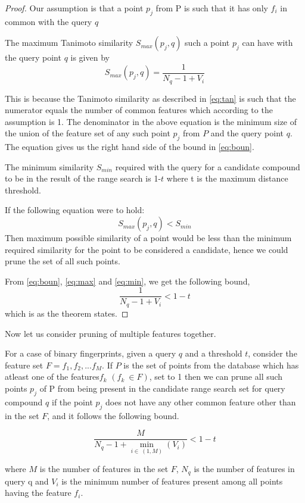 \begin{proof}
\label{proof1}
Our assumption is that a point $p_j$ from P is such that it has only $f_i$ in common with the query $q$  
 
The maximum Tanimoto similarity $S_{max}(p_j,q)$ such a point $p_j$ can have with the query point $q$ is given by
\begin{equation}
\label{eq:max}
S_{max}(p_j,q)=\frac{1}{N_q - 1 + V_{i}}
\end{equation}

This is because the Tanimoto similarity as described in \autoref{eq:tan} is such that the numerator equals the number of common features which according to the assumption is 1. The denominator in the above equation is the minimum size of the union of the feature set of any such point $p_j$ from $P$ and the query point $q$.
The equation gives us the right hand side of the bound 
in \autoref{eq:boun}. 

The minimum similarity $S_{min}$ required with the query for a candidate compound to be in the result of the range search is 1-$t$ where t is the maximum distance threshold.

If the following equation were to hold:
\begin{equation}
\label{eq:min}
	S_{max}(p_j,q) < S_{min}
\end{equation}
Then maximum possible similarity of a point would be less than the minimum required similarity for the point to be considered a candidate, hence we could prune the set of all such points.

From \autoref{eq:boun}, \autoref{eq:max} and \autoref{eq:min}, we get the following bound,
\begin{equation}
\frac{1}{N_q - 1 + V_{i}}  < 1-t
\end{equation}
which is as the theorem states.
\end{proof}


Now let us consider pruning of multiple features together. 


\begin{thm}
\label{thm2bound}
For a case of binary fingerprints, given a query $q$ and a threshold $t$, consider the feature set $F=f_1, f_2,...f_M$. If $P$ is the set of points from the database which has atleast one of the features$f_k$  $(f_k~\in F)$, set to 1 then we can prune all such points $p_j$ of P from being present in the candidate range search set for query compound $q$ if the point $p_j$ does not have any other common feature other than in the set $F$, and it follows the following bound. 

\begin{equation}
\label{eq:boun2}
\frac{M}{N_q - 1 + \min\limits_{i\in~(1,M)}(V_i) } < 1-t 
\end{equation}

where $M$ is the number of features in the set $F$, $N_q$ is the number of features in query q and $V_{i}$ is the minimum number of features present among all points having the feature $f_i$.




\end{thm}

